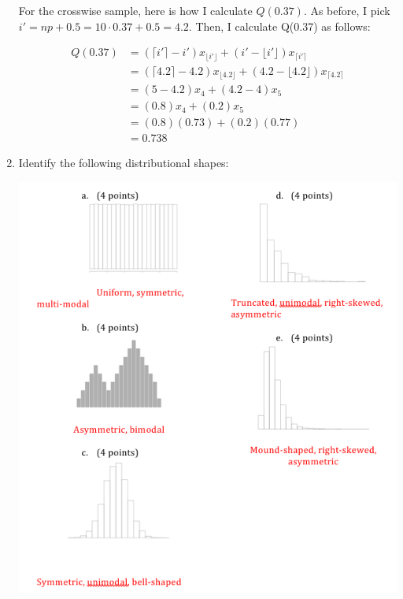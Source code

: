 \documentclass{article}\usepackage{graphicx, color}
\numberwithin{equation}{section}
\begin{document}
\begin{flushleft}
\begin{enumerate}[1. ]
For the crosswise sample, here is how I calculate $Q(0.37)$. As before, I pick $i' = np + 0.5 = 10 \cdot 0.37 + 0.5 = 4.2$. Then, I calculate Q(0.37) as follows:

\begin{align*}
Q(0.37) &= (\lceil i' \rceil - i') x_{\lfloor i' \rfloor} + ( i' - \lfloor i' \rfloor) x_{\lceil i' \rceil} \\
&= (\lceil 4.2 \rceil - 4.2) x_{\lfloor 4.2 \rfloor} + ( 4.2 - \lfloor 4.2 \rfloor) x_{\lceil 4.2 \rceil} \\
&= (5- 4.2) x_{4} + ( 4.2 - 4) x_{5} \\
&= (0.8) x_{4} + (0.2) x_{5} \\
&= (0.8)(0.73) + (0.2)(0.77) \\
&= 0.738
\end{align*}


\color{black}


\item Identify the following distributional shapes:

 \includegraphics{../../fig/hw2shapessol.png}













\end{enumerate}
\end{flushleft}
\end{document}
